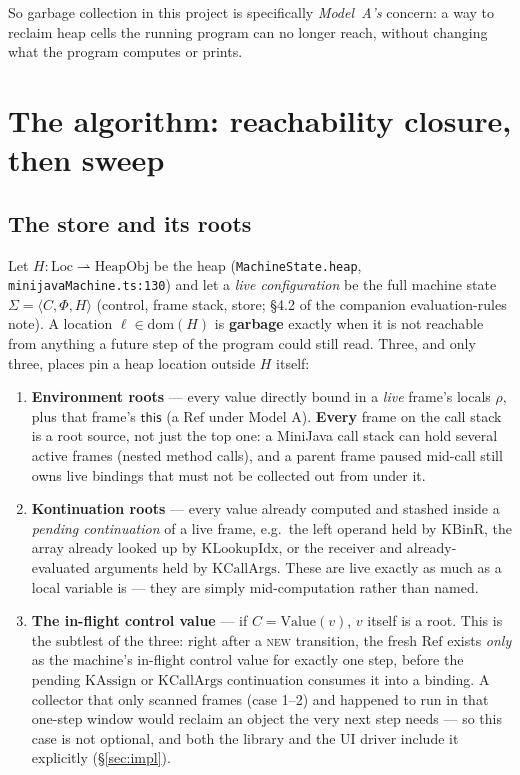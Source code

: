 \documentclass[11pt]{article}
\newcommand{\rulename}[1]{\textsc{#1}}
\newcommand{\dom}{\mathrm{dom}}
\newcommand{\Loc}{\mathrm{Loc}}
\begin{document}
So garbage collection in this project is specifically \emph{Model~A's}
concern: a way to reclaim heap cells the running program can no longer
reach, without changing what the program computes or prints.

\section{The algorithm: reachability closure, then sweep}
\label{sec:algorithm}

\subsection{The store and its roots}

Let $H : \Loc \rightharpoonup \mathrm{HeapObj}$ be the heap (\texttt{MachineState.heap},
\texttt{minijavaMachine.ts:130}) and let a \emph{live configuration} be the
full machine state $\Sigma = \langle C, \Phi, H\rangle$ (control, frame
stack, store; \S4.2 of the companion evaluation-rules note). A location
$\ell \in \dom(H)$ is \textbf{garbage} exactly when it is not reachable from
anything a future step of the program could still read. Three, and only
three, places pin a heap location outside $H$ itself:

\begin{enumerate}
  \item \textbf{Environment roots} --- every value directly bound in a
        \emph{live} frame's locals $\rho$, plus that frame's $\mathsf{this}$
        (a $\mathrm{Ref}$ under Model A). \textbf{Every} frame on the call
        stack is a root source, not just the top one: a MiniJava call stack
        can hold several active frames (nested method calls), and a parent
        frame paused mid-call still owns live bindings that must not be
        collected out from under it.
  \item \textbf{Kontinuation roots} --- every value already computed and
        stashed inside a \emph{pending continuation} of a live frame, e.g.\
        the left operand held by $\mathrm{KBinR}$, the array already looked
        up by $\mathrm{KLookupIdx}$, or the receiver and already-evaluated
        arguments held by $\mathrm{KCallArgs}$. These are live exactly as
        much as a local variable is --- they are simply mid-computation
        rather than named.
  \item \textbf{The in-flight control value} --- if $C = \mathrm{Value}(v)$,
        $v$ itself is a root. This is the subtlest of the three: right
        after a \rulename{new} transition, the fresh $\mathrm{Ref}$ exists
        \emph{only} as the machine's in-flight control value for exactly
        one step, before the pending $\mathrm{KAssign}$ or
        $\mathrm{KCallArgs}$ continuation consumes it into a binding. A
        collector that only scanned frames (case 1--2) and happened to run
        in that one-step window would reclaim an object the very next step
        needs --- so this case is not optional, and both the library and
        the UI driver include it explicitly (\S\ref{sec:impl}).
\end{enumerate}
\end{document}
